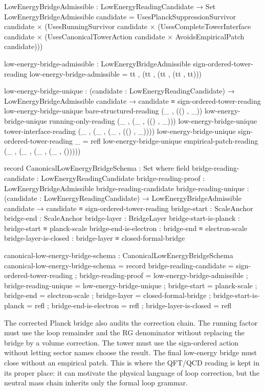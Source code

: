 \documentclass[11pt]{article}
\begin{document}
\begin{code}
LowEnergyBridgeAdmissible : LowEnergyReadingCandidate → Set
LowEnergyBridgeAdmissible candidate =
  UsesPlanckSuppressionSurvivor candidate ×
  (UsesRunningSurvivor candidate ×
  (UsesCompleteTowerInterface candidate ×
  (UsesCanonicalTowerAction candidate × AvoidsEmpiricalPatch candidate)))

low-energy-bridge-admissible :
  LowEnergyBridgeAdmissible sign-ordered-tower-reading
low-energy-bridge-admissible = tt , (tt , (tt , (tt , tt)))

low-energy-bridge-unique :
  (candidate : LowEnergyReadingCandidate) →
  LowEnergyBridgeAdmissible candidate →
  candidate ≡ sign-ordered-tower-reading
low-energy-bridge-unique bare-structured-reading (_ , (() , _))
low-energy-bridge-unique running-only-reading (_ , (_ , (() , _)))
low-energy-bridge-unique tower-interface-reading (_ , (_ , (_ , (() , _))))
low-energy-bridge-unique sign-ordered-tower-reading _ = refl
low-energy-bridge-unique empirical-patch-reading (_ , (_ , (_ , (_ , ()))))

record CanonicalLowEnergyBridgeSchema : Set where
  field
    bridge-reading-candidate : LowEnergyReadingCandidate
    bridge-reading-proof     : LowEnergyBridgeAdmissible bridge-reading-candidate
    bridge-reading-unique    :
      (candidate : LowEnergyReadingCandidate) →
      LowEnergyBridgeAdmissible candidate →
      candidate ≡ sign-ordered-tower-reading
    bridge-start             : ScaleAnchor
    bridge-end               : ScaleAnchor
    bridge-layer             : BridgeLayer
    bridge-start-is-planck   : bridge-start ≡ planck-scale
    bridge-end-is-electron   : bridge-end ≡ electron-scale
    bridge-layer-is-closed   : bridge-layer ≡ closed-formal-bridge

canonical-low-energy-bridge-schema : CanonicalLowEnergyBridgeSchema
canonical-low-energy-bridge-schema = record
  { bridge-reading-candidate = sign-ordered-tower-reading
  ; bridge-reading-proof     = low-energy-bridge-admissible
  ; bridge-reading-unique    = low-energy-bridge-unique
  ; bridge-start             = planck-scale
  ; bridge-end               = electron-scale
  ; bridge-layer             = closed-formal-bridge
  ; bridge-start-is-planck   = refl
  ; bridge-end-is-electron   = refl
  ; bridge-layer-is-closed   = refl
  }
\end{code}

The corrected Planck bridge also audits the correction chain.  The running
factor must use the loop remainder and the RG denominator without replacing
the bridge by a volume correction.  The tower must use the sign-ordered action
without letting sector names choose the result.  The final low-energy bridge
must close without an empirical patch.  This is where the QFT/QCD reading is
kept in its proper place: it can motivate the physical language of loop
correction, but the neutral mass chain inherits only the formal loop grammar.
\end{document}
